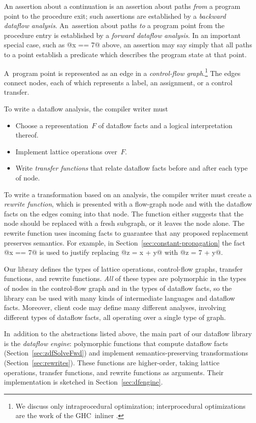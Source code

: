 \documentclass[blockstyle,preprint,natbib,nocopyrightspace]{sigplanconf}
\let\cite\citep
\newcommand\secref[1]{Section~\ref{sec:#1}}
\begin{document}
An assertion about a continuation is an assertion about paths
\emph{from} a program point 
to the procedure {exit};
such assertions are established by a \emph{backward dataflow analysis}.
An~assertion about paths \emph{to} a program point from the procedure
{entry} is established by a \emph{forward dataflow analysis}.
In an important special case, such as @x == 7@ above,
an assertion may say simply
that all paths to a point establish a predicate which describes the program
state at that point. 

A~program point is represented as an edge in
a \emph{control-flow graph}.\footnote
{We discuss only intraprocedural optimization;
interprocedural optimizations are the work of the GHC~inliner
\cite{peyton-jones:secrets-inliner}.} 
The edges connect nodes, each of which represents a label, an assignment, or
a control transfer.

To write a dataflow analysis, the compiler
writer must 
\begin{itemize}
\item
Choose a representation~$F$ of dataflow facts and a logical interpretation
thereof.
\item
Implement lattice operations over~$F$.
\item
Write \emph{transfer functions} that relate dataflow facts before and
after each type of node.
\end{itemize}

To write a transformation based on an analysis, the compiler writer
must create a \emph{rewrite function}, which is presented with a
flow-graph node and with the dataflow facts on the edges coming
into that node.
The function either suggests that the node should be replaced with a
fresh subgraph, or it leaves the node alone.
The rewrite function uses incoming facts to guarantee that
any proposed replacement preserves semantics.
For example, in \secref{constant-propagation} the fact @x == 7@ is
used to justify replacing @z = x + y@ with @z = 7 + y@.

Our library defines the types of lattice operations,
control-flow graphs, transfer functions, and rewrite functions.
\emph{All} of these types are polymorphic in the types of
nodes in the control-flow graph and in the types of dataflow facts, so
the library can be used with many kinds of intermediate languages and
dataflow facts.
Moreover, client code may define many different analyses, involving
different types of dataflow facts, all operating over a single type of
graph. 

In~addition to the abstractions listed above, the main part of our
dataflow library is the \emph{dataflow engine}:  
polymorphic functions that compute 
dataflow facts (\secref{zdfSolveFwd}) and implement
semantics-preserving transformations (\secref{rewrites}).
These functions are higher-order, taking lattice operations, transfer
functions, and rewrite functions as arguments.
Their implementation is sketched in \secref{dfengine}.
\end{document}
